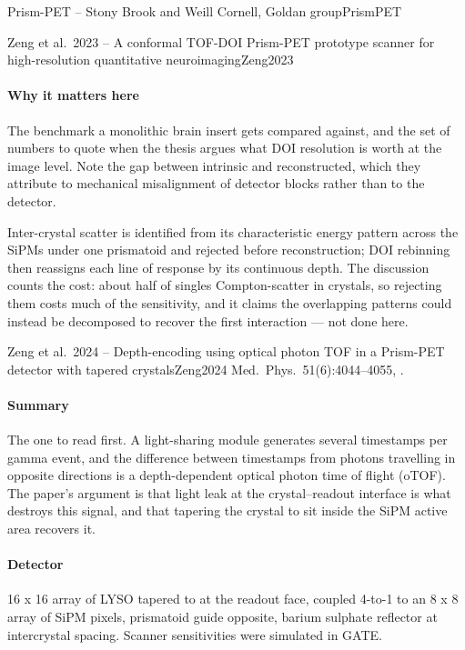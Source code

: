 \begin{programnote}{Prism-PET -- Stony Brook and Weill Cornell, Goldan group}{PrismPET}
\begin{papernote}{Zeng et al.\ 2023 -- A conformal TOF-DOI Prism-PET prototype scanner for high-resolution quantitative neuroimaging}{Zeng2023}
\paragraph{Why it matters here}
The benchmark a monolithic brain insert gets compared against, and the set of
numbers to quote when the thesis argues what DOI resolution is worth at the
image level. Note the gap between  intrinsic and 
reconstructed, which they attribute to mechanical misalignment of detector
blocks rather than to the detector.

Inter-crystal scatter is identified from its characteristic energy pattern
across the SiPMs under one prismatoid and rejected before reconstruction; DOI
rebinning then reassigns each line of response by its continuous depth. The
discussion counts the cost: about half of singles Compton-scatter in
 crystals, so rejecting them costs much of the sensitivity, and it claims the
overlapping patterns could instead be decomposed to recover the first
interaction --- not done here.

\end{papernote}

\begin{papernote}{Zeng et al.\ 2024 -- Depth-encoding using optical photon TOF in a Prism-PET detector with tapered crystals}{Zeng2024}
Med.\ Phys.\ 51(6):4044--4055, .

\paragraph{Summary}
The one to read first. A light-sharing module generates several timestamps per
gamma event, and the difference between timestamps from photons travelling in
opposite directions is a depth-dependent optical photon time of flight (oTOF).
The paper's argument is that light leak at the crystal--readout interface is
what destroys this signal, and that tapering the crystal to sit inside the SiPM
active area recovers it.

\paragraph{Detector}
16 x 16 array of  LYSO tapered to
 at the readout face, coupled 4-to-1 to an
8 x 8 array of  SiPM pixels, prismatoid guide
opposite, barium sulphate reflector at  intercrystal spacing. Scanner
sensitivities were simulated in GATE.


\end{papernote}
\end{programnote}
